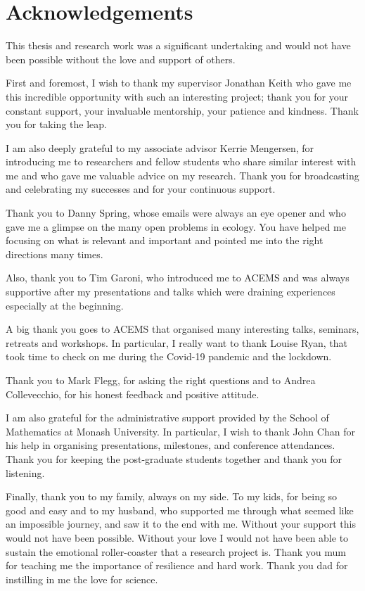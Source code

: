 \section*{Acknowledgements}

\newlength\oldparskip
\setlength{\oldparskip}{\parskip}
\setlength{\parskip}{1cm}


This thesis and research work was a significant undertaking and would not have been possible without the love and support of others.

First and foremost, I wish to thank my supervisor Jonathan Keith who gave me this incredible opportunity with such an interesting project; thank you for your constant support, your invaluable mentorship, your patience and kindness. Thank you for taking the leap.

I am also deeply grateful to my associate advisor Kerrie Mengersen, for introducing me to researchers and fellow students who share similar interest with me and who gave me valuable advice on my research. Thank you for broadcasting and celebrating my successes and for your continuous support.

Thank you to Danny Spring, whose emails were always an eye opener and who gave me a glimpse on the many open problems in ecology. You have helped me focusing on what is relevant and important and pointed me into the right directions many times. 

Also, thank you to Tim Garoni, who introduced me to ACEMS and was always supportive after my presentations and talks which were draining experiences especially at the beginning.

A big thank you goes to ACEMS that organised many interesting talks, seminars, retreats and workshops. In particular, I really want to thank Louise Ryan, that took time to check on me during the Covid-19 pandemic and the lockdown.

Thank you to Mark Flegg, for asking the right questions and to Andrea Collevecchio, for his honest feedback and positive attitude.

I am also grateful for the administrative support provided by the School of Mathematics at Monash University. In particular, I wish to thank John Chan for his help in organising presentations, milestones, and conference attendances. Thank you for keeping the post-graduate students together and thank you for listening.

Finally, thank you to my family, always on my side. To my kids, for being so good and easy and to my husband, who supported me through what seemed like an impossible journey, and saw it to the end with me. Without your support this would not have been possible. Without your love I would not have been able to sustain the emotional roller-coaster that a research project is.
Thank you mum for teaching me the importance of resilience and hard work.
Thank you dad for instilling in me the love for science.


%


\setlength{\parskip}{\oldparskip}
